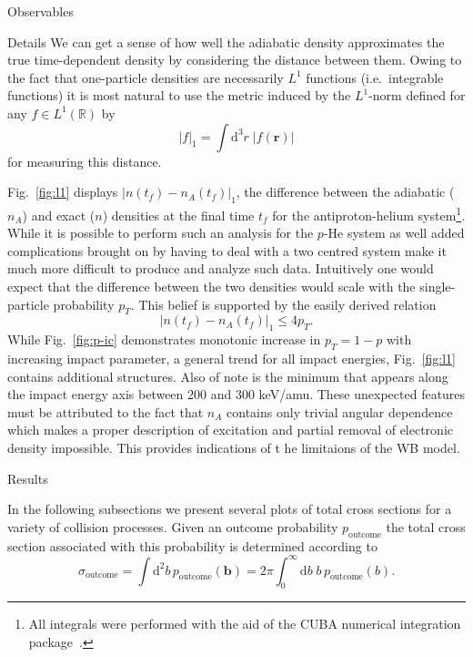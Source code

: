 \documentclass[letterpaper, 11 pt]{report}
\begin{document}
\begin{chapter}{Observables \label{chap:p-he2p-he}}
\begin{section}{Details \label{sec:phe2p-det}}
      We can get a sense of how well the adiabatic density approximates the true time-dependent density
      by considering the distance between them. Owing to the fact that one-particle densities are 
      necessarily $L^1$ functions (i.e.\ integrable functions) it is most natural to use the metric
      induced by the $L^1$-norm defined for any $f \in L^1\left(\mathbb{R}\right)$ by
      \begin{equation} \label{eq:l1rorm}
         \left| f \right|_1 = \int \mathrm{d}^3 r \; \left| f(\mathbf{r}) \right|
      \end{equation}
      for measuring this distance.
      
      Fig.~\ref{fig:l1} displays $\left| n\left(t_f\right) - n_A\left(t_f\right) \right|_1$, the
      difference between the adiabatic ($n_A$) and exact ($n$) densities at the final time $t_f$ for the
      antiproton-helium system\footnote{All integrals were performed with the aid of the CUBA numerical
      integration package~\cite{cuba}.}. While it is possible to perform such an analysis for the $p$-He
      system as well added complications brought on by having to deal with a two centred system make it
      much more difficult to produce and analyze such data. Intuitively one would expect that the
      difference between the two densities would scale with the single-particle probability $p_T$. This
      belief is supported by the easily derived relation 
      \begin{equation} \label{eq:diff-bound}
         \left| n(t_f) - n_A(t_f) \right|_1 \leq 4 p_T.
      \end{equation}
      While Fig.~\ref{fig:p-ic} demonstrates monotonic increase in $p_T = 1 - p$ with increasing impact
      parameter, a general trend for all impact energies, Fig.~\ref{fig:l1} contains additional
      structures. Also of note is the minimum that appears along the impact energy axis between 200 and
      300 keV/amu. These unexpected features must be attributed to the fact that $n_A$ contains only
      trivial angular dependence which makes a proper description of excitation and partial removal of
      electronic density impossible. This provides indications of t he limitaions of the WB model.

   \end{section}

   \begin{section}{Results \label{sec:phe2p-res}}

      In the following subsections we present several plots of total cross sections for a variety of
      collision processes. Given an outcome probability $p_\mathrm{outcome}$ the total cross section
      associated with this probability is determined according to
      \begin{equation} \label{eq:tcs}
         \sigma_\mathrm{outcome} = \int \mathrm{d}^2 b \, p_\mathrm{outcome} (\mathbf{b})
         = 2 \pi \int^\infty_0 \mathrm{d}b \; b \, p_\mathrm{outcome} (b).
      \end{equation}
   

\end{section}
\end{chapter}
\end{document}
